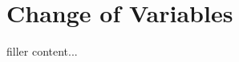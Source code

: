 \documentclass[../../templates/section]{subfiles}
\begin{document}
\section{Change of Variables}\label{sec:change-of-variables}

filler content...
\end{document}
